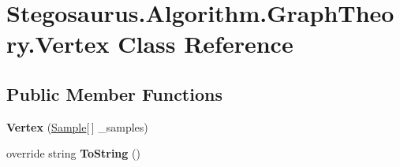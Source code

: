 \hypertarget{class_stegosaurus_1_1_algorithm_1_1_graph_theory_1_1_vertex}{}\section{Stegosaurus.\+Algorithm.\+Graph\+Theory.\+Vertex Class Reference}
\label{class_stegosaurus_1_1_algorithm_1_1_graph_theory_1_1_vertex}
\subsection*{Public Member Functions}
\begin{DoxyCompactItemize}
\item 
{\bfseries Vertex} (\hyperlink{class_stegosaurus_1_1_algorithm_1_1_graph_theory_1_1_sample}{Sample}\mbox{[}$\,$\mbox{]} \+\_\+samples)\hypertarget{class_stegosaurus_1_1_algorithm_1_1_graph_theory_1_1_vertex_a9441081614ef3fbf3f8baf25de92533e}{}\label{class_stegosaurus_1_1_algorithm_1_1_graph_theory_1_1_vertex_a9441081614ef3fbf3f8baf25de92533e}

\item 
override string {\bfseries To\+String} ()\hypertarget{class_stegosaurus_1_1_algorithm_1_1_graph_theory_1_1_vertex_aede634e13ec0c349ff353b95fa12c86e}{}\label{class_stegosaurus_1_1_algorithm_1_1_graph_theory_1_1_vertex_aede634e13ec0c349ff353b95fa12c86e}

\end{DoxyCompactItemize}

